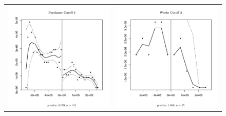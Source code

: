 \documentclass[11pt]{article}
\begin{document}
\begin{figure}[!htbp]
\begin{tabular}{cc}
  \includegraphics[scale = .45]{../plots/purchasesmanipulation3.pdf} &
  \includegraphics[scale = .45]{../plots/worksmanipulation3.pdf} \\
  \end{tabular}
\end{figure}
\end{document}
